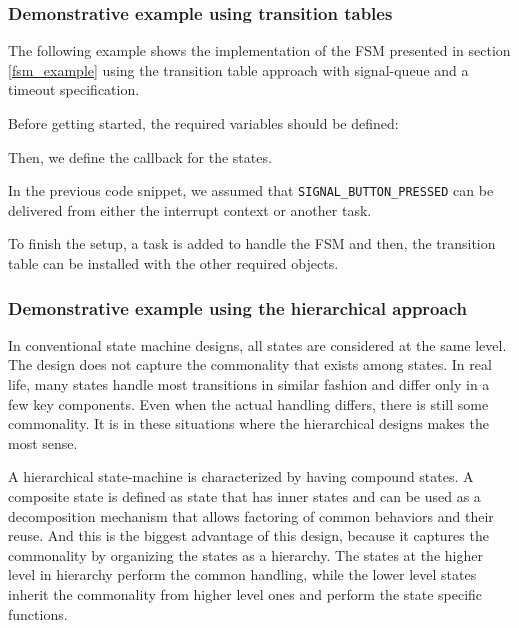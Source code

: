 \subsubsection{Demonstrative example using transition tables}
The following example shows the implementation of the FSM presented in section \ref{fsm_example} using the transition table approach with signal-queue and a timeout specification.

Before getting started, the required variables should be defined: 
\medskip



Then, we define the callback for the states.
\medskip



In the previous code snippet, we assumed that \lstinline{SIGNAL_BUTTON_PRESSED} can be delivered from either the interrupt context or another task.

To finish the setup, a task is added to handle the FSM and then, the transition table can be installed with the other required objects.
\medskip



\subsubsection{Demonstrative example using the hierarchical approach} 
In conventional state machine designs, all states are considered at the same level. The design does not capture the commonality that exists among states. In real life, many states handle most transitions in similar fashion and differ only in a few key components. Even when the actual handling differs, there is still some commonality. It is in these situations where the hierarchical designs makes the most sense.



A hierarchical state-machine is characterized by having compound states. A composite state is defined as state that has inner states and can be used as a decomposition mechanism that allows factoring of common behaviors and their reuse. And this is the biggest advantage of this design, because it captures the commonality by organizing the states as a hierarchy. The states at the higher level in hierarchy perform the common handling, while the lower level states inherit the commonality from higher level ones and perform the state specific functions.

